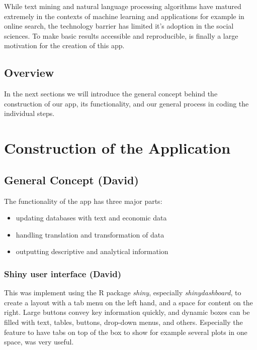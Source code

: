 \documentclass[12pt,a4paper]{article}
\begin{document}
While text mining and natural language processing algorithms have
matured extremely in the contexts of machine learning and applications
for example in online search, the technology barrier has limited it's
adoption in the social sciences. To make basic results accessible and
reproducible, is finally a large motivation for the creation of this
app.

\hypertarget{overview}{%
\subsection{Overview}\label{overview}}

In the next sections we will introduce the general concept behind the
construction of our app, its functionality, and our general process in
coding the individual steps.

\hypertarget{construction-of-the-application}{%
\section{Construction of the
Application}\label{construction-of-the-application}}

\hypertarget{general-concept-david}{%
\subsection{General Concept (David)}\label{general-concept-david}}

The functionality of the app has three major parts:

\begin{itemize}
\tightlist
\item
  updating databases with text and economic data
\item
  handling translation and transformation of data
\item
  outputting descriptive and analytical information
\end{itemize}

\hypertarget{shiny-user-interface-david}{%
\subsubsection{Shiny user interface
(David)}\label{shiny-user-interface-david}}

This was implement using the R package \emph{shiny}, especially
\emph{shinydashboard}, to create a layout with a tab menu on the left
hand, and a space for content on the right. Large buttons convey key
information quickly, and dynamic boxes can be filled with text, tables,
buttons, drop-down menus, and others. Especially the feature to have
tabs on top of the box to show for example several plots in one space,
was very useful.
\end{document}
